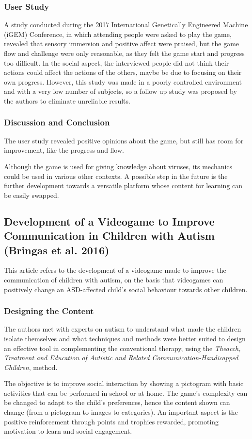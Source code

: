 \documentclass[runningheads]{llncs}
\begin{document}
\subsubsection{User Study}
\par A study conducted during the 2017 International Genetically Engineered Machine (iGEM) Conference, in which attending people were asked to play the game, revealed that sensory immersion and positive affect were praised, but the game flow and challenge were only reasonable, as they felt the game start and progress too difficult. In the social aspect, the interviewed people did not think their actions could affect the actions of the others, maybe be due to focusing on their own progress. However, this study was made in a poorly controlled environment and with a very low number of subjects, so a follow up study was proposed by the authors to eliminate unreliable results.

\subsubsection{Discussion and Conclusion}
\par The user study revealed positive opinions about the game, but still has room for improvement, like the progress and flow.
\par Although the game is used for giving knowledge about viruses, its mechanics could be used in various other contexts. A possible step in the future is the further development towards a versatile platform whose content for learning can be easily swapped. 



\subsection{Development of a Videogame to Improve Communication in Children with Autism (Bringas et al. 2016)}
\par This article refers to the development of a videogame made to improve the communication of children with autism, on the basis that videogames can positively change an ASD-affected child's social behaviour towards other children.

\subsubsection{Designing the Content}
\par The authors met with experts on autism to understand what made the children isolate themselves and what techniques and methods were better suited to design an effective tool in complementing the conventional therapy, using the \textit{Theacch, Treatment and Education of Autistic and Related Communication-Handicapped Children}, method.
\par The objective is to improve social interaction by showing a pictogram with basic activities that can be performed in school or at home.
The game's complexity can be changed to adapt to the child's preferences, hence the content shown can change (from a pictogram to images to categories). An important aspect is the positive reinforcement through points and trophies rewarded, promoting motivation to learn and social engagement.
\end{document}

